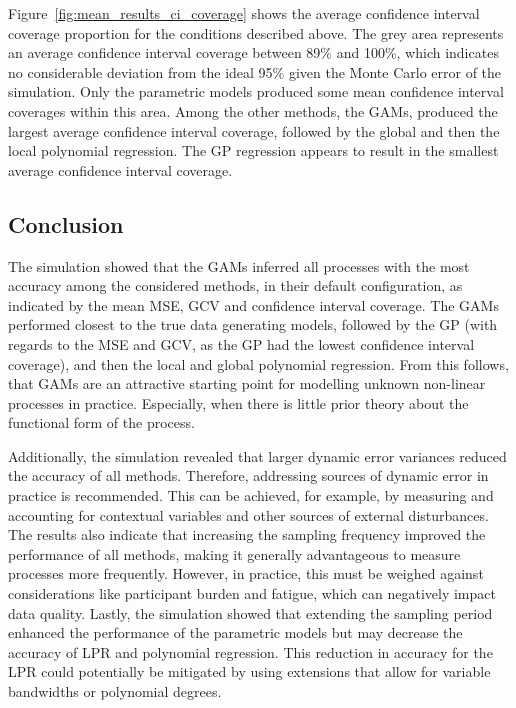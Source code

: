 \documentclass[man, floatsintext]{apa7}
\begin{document}
Figure~\ref{fig:mean_results_ci_coverage} shows the average confidence interval
coverage proportion for the conditions described above. The grey area
represents an average confidence interval coverage between 89\% and 100\%,
which indicates no considerable deviation from the ideal 95\% given the Monte
Carlo error of the simulation. Only the parametric models produced some mean
confidence interval coverages within this area. Among the other methods, the
GAMs, produced the largest average confidence interval coverage, followed by
the global and then the local polynomial regression. The GP regression appears
to result in the smallest average confidence interval coverage.

\begin{sidewaysfigure*}[htbp]
  \caption{Average confidence interval coverage across all processes, analysis
    methods, and simulation conditions}
  \label{fig:mean_results_ci_coverage}
\end{sidewaysfigure*}

\subsection{Conclusion}

The simulation showed that the GAMs inferred all processes with the most
accuracy among the considered methods, in their default configuration, as
indicated by the mean MSE, GCV and confidence interval coverage. The GAMs
performed closest to the true data generating models, followed by the GP (with
regards to the MSE and GCV, as the GP had the lowest confidence interval
coverage), and then the local and global polynomial regression. From this
follows, that GAMs are an attractive starting point for modelling unknown
non-linear processes in practice. Especially, when there is little prior theory
about the functional form of the process.

Additionally, the simulation revealed that larger dynamic error variances
reduced the accuracy of all methods. Therefore, addressing sources of dynamic
error in practice is recommended. This can be achieved, for example, by
measuring and accounting for contextual variables and other sources of external
disturbances. The results also indicate that increasing the sampling frequency
improved the performance of all methods, making it generally advantageous to
measure processes more frequently. However, in practice, this must be weighed
against considerations like participant burden and fatigue, which can
negatively impact data quality. Lastly, the simulation showed that extending
the sampling period enhanced the performance of the parametric models but may
decrease the accuracy of LPR and polynomial regression. This reduction in
accuracy for the LPR could potentially be mitigated by using extensions that
allow for variable bandwidths or polynomial degrees.
\end{document}
